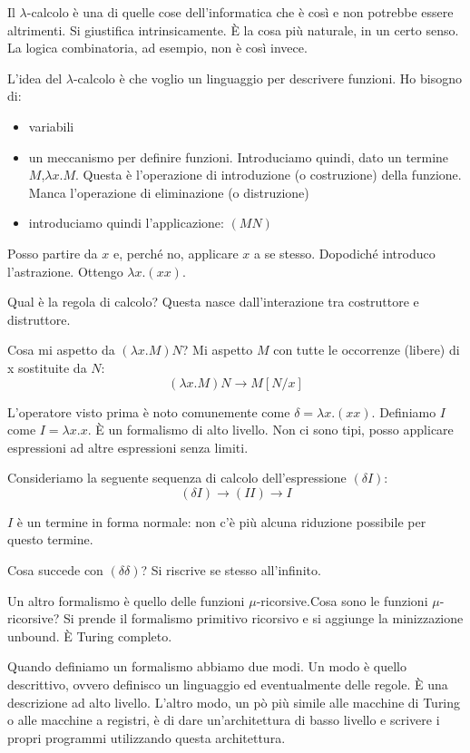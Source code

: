 Il $\lambda$-calcolo è una di quelle cose dell'informatica che è così e non potrebbe essere
altrimenti. Si giustifica intrinsicamente. È la cosa più naturale, in un certo senso. La logica
combinatoria, ad esempio, non è così invece.

L'idea del $\lambda$-calcolo è che voglio un linguaggio per descrivere funzioni. Ho bisogno di:
\begin{itemize}
    \item variabili
    \item un meccanismo per definire funzioni. Introduciamo quindi, dato un termine $M$,$\lambda
    x. M$. Questa è l'operazione di introduzione (o costruzione) della funzione. Manca l'operazione di
    eliminazione (o distruzione)
    \item introduciamo quindi l'applicazione: $(M N)$
\end{itemize}
Posso partire da $x$ e, perché no, applicare $x$ a se stesso. Dopodiché introduco l'astrazione.
Ottengo $\lambda x. (x x)$.

Qual è la regola di calcolo? Questa nasce dall'interazione tra costruttore e distruttore.

Cosa mi aspetto da $(\lambda x. M) N$? Mi aspetto $M$ con tutte le occorrenze (libere) di x sostituite
da $N$:
\begin{equation*}
    (\lambda x. M) N \to M[N/x]
\end{equation*}

L'operatore visto prima è noto comunemente come $\delta = \lambda x. (x x)$. Definiamo $I$ come $I =
\lambda x. x$. È un formalismo di alto livello. Non ci sono tipi, posso applicare espressioni ad
altre espressioni senza limiti.

Consideriamo la seguente sequenza di calcolo dell'espressione $(\delta I)$:
\begin{equation*}
    (\delta I) \to (I I) \to I
\end{equation*}

$I$ è un termine in forma normale: non c'è più alcuna riduzione possibile per questo termine.

Cosa succede con $(\delta \delta)$? Si riscrive se stesso all'infinito.

Un altro formalismo è quello delle funzioni $\mu$-ricorsive.Cosa sono le funzioni $\mu$-ricorsive?
Si prende il formalismo primitivo ricorsivo e si aggiunge la minizzazione unbound. È Turing
completo.

Quando definiamo un formalismo abbiamo due modi. Un modo è quello descrittivo, ovvero definisco un
linguaggio ed eventualmente delle regole. È una descrizione ad alto livello. L'altro modo, un pò
più simile alle macchine di Turing o alle macchine a registri, è di dare un'architettura di basso
livello e scrivere i propri programmi utilizzando questa architettura.

